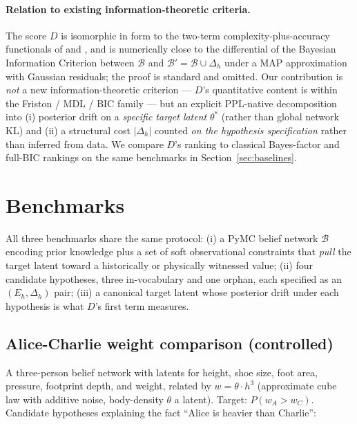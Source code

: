 \documentclass{article}
\begin{document}
\paragraph{Relation to existing information-theoretic criteria.}
The score $D$ is isomorphic in form to the two-term
complexity-plus-accuracy functionals of \citet{friston2010free} and
\citet{rissanen1978modelingShortestDescription}, and is
numerically close to the differential of the Bayesian Information
Criterion \citep{schwarz1978} between $\mathcal{B}$ and
$\mathcal{B}' = \mathcal{B} \cup \Delta_{h}$ under a MAP approximation
with Gaussian residuals; the proof is standard and omitted. Our
contribution is \emph{not} a new information-theoretic criterion ---
$D$'s quantitative content is within the
Friston / MDL / BIC family --- but an explicit PPL-native
decomposition into (i) posterior drift on a \emph{specific target
latent} $\theta^{*}$ (rather than global network KL) and (ii) a
structural cost $|\Delta_{h}|$ counted \emph{on the hypothesis
specification} rather than inferred from data. We compare $D$'s
ranking to classical Bayes-factor and full-BIC rankings on the same
benchmarks in Section~\ref{sec:baselines}.

\section{Benchmarks}
\label{sec:benchmarks}

All three benchmarks share the same protocol: (i) a PyMC belief network
$\mathcal{B}$ encoding prior knowledge plus a set of soft observational
constraints that \emph{pull} the target latent toward a historically or
physically witnessed value; (ii) four candidate hypotheses, three
in-vocabulary and one orphan, each specified as an $(E_{h}, \Delta_{h})$
pair; (iii) a canonical target latent whose posterior drift under each
hypothesis is what $D$'s first term measures.

\subsection{Alice-Charlie weight comparison (controlled)}
\label{sec:alice-charlie}

A three-person belief network with latents for height, shoe size, foot
area, pressure, footprint depth, and weight, related by
$w = \theta \cdot h^{3}$ (approximate cube law with additive noise,
body-density $\theta$ a latent). Target: $P(w_{A} > w_{C})$. Candidate
hypotheses explaining the fact ``Alice is heavier than Charlie'':
\end{document}
